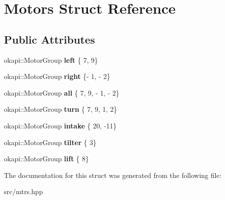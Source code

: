 \hypertarget{structMotors}{}\section{Motors Struct Reference}
\label{structMotors}
\subsection*{Public Attributes}
\begin{DoxyCompactItemize}
\item 
\mbox{\label{structMotors_a5d90605286ca0f8c23b6028ac8effa99}} 
okapi\+::\+Motor\+Group {\bfseries left} \{ 7, 9\}
\item 
\mbox{\label{structMotors_aace6e441817be571ca0b47544651524c}} 
okapi\+::\+Motor\+Group {\bfseries right} \{-\/ 1, -\/ 2\}
\item 
\mbox{\label{structMotors_a0db996aa93ee6158ae31e1a731f7cab2}} 
okapi\+::\+Motor\+Group {\bfseries all} \{ 7, 9, -\/ 1, -\/ 2\}
\item 
\mbox{\label{structMotors_a078d4438849e9932901729f486d2d81d}} 
okapi\+::\+Motor\+Group {\bfseries turn} \{ 7, 9, 1, 2\}
\item 
\mbox{\label{structMotors_a72cd7862603c24e3fafd849f76035935}} 
okapi\+::\+Motor\+Group {\bfseries intake} \{ 20, -\/11\}
\item 
\mbox{\label{structMotors_a60bfc869c3283289d502741a39b74d83}} 
okapi\+::\+Motor\+Group {\bfseries tilter} \{ 3\}
\item 
\mbox{\label{structMotors_a2bff81f52c0339b7c92cdfa0827f7b6c}} 
okapi\+::\+Motor\+Group {\bfseries lift} \{ 8\}
\end{DoxyCompactItemize}


The documentation for this struct was generated from the following file\+:\begin{DoxyCompactItemize}
\item 
src/mtrs.\+hpp\end{DoxyCompactItemize}
